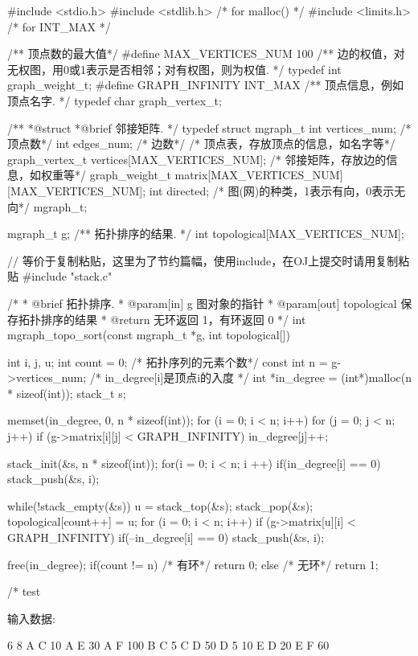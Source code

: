 \begin{Codex}[label=mgraph_topo_sort.c]
#include <stdio.h>
#include <stdlib.h>  /* for malloc() */
#include <limits.h>  /* for INT_MAX */

/** 顶点数的最大值*/
#define MAX_VERTICES_NUM 100
/** 边的权值，对无权图，用0或1表示是否相邻；对有权图，则为权值. */
typedef int graph_weight_t;
#define GRAPH_INFINITY INT_MAX
/** 顶点信息，例如顶点名字. */
typedef char graph_vertex_t;

/**
 *@struct
 *@brief 邻接矩阵.
 */
typedef struct mgraph_t {
    int vertices_num; /* 顶点数*/
    int edges_num; /* 边数*/
    /* 顶点表，存放顶点的信息，如名字等*/
    graph_vertex_t vertices[MAX_VERTICES_NUM];
    /* 邻接矩阵，存放边的信息，如权重等*/
    graph_weight_t matrix[MAX_VERTICES_NUM][MAX_VERTICES_NUM];
    int directed; /* 图(网)的种类，1表示有向，0表示无向*/
} mgraph_t;

mgraph_t g;
/** 拓扑排序的结果. */
int topological[MAX_VERTICES_NUM];

// 等价于复制粘贴，这里为了节约篇幅，使用include，在OJ上提交时请用复制粘贴
#include "stack.c"

/*
  * @brief 拓扑排序.
  * @param[in] g 图对象的指针
  * @param[out] topological 保存拓扑排序的结果
  * @return 无环返回 1，有环返回 0
  */
int mgraph_topo_sort(const mgraph_t *g, int topological[]) {
    int i, j, u;
    int count = 0; /* 拓扑序列的元素个数*/
    const int n = g->vertices_num;
    /* in_degree[i]是顶点i的入度 */
    int *in_degree = (int*)malloc(n * sizeof(int));
    stack_t s;

    memset(in_degree, 0, n * sizeof(int));
    for (i = 0; i < n; i++) {
        for (j = 0; j < n; j++) {
            if (g->matrix[i][j] < GRAPH_INFINITY)
                in_degree[j]++;
        }
    }

    stack_init(&s, n * sizeof(int));
    for(i = 0; i < n; i ++) {
        if(in_degree[i] == 0)
            stack_push(&s, i);
    }

    while(!stack_empty(&s)) {
        u = stack_top(&s); stack_pop(&s);
        topological[count++] = u;
        for (i = 0; i < n; i++) if (g->matrix[u][i] < GRAPH_INFINITY) {
            if(--in_degree[i] == 0) stack_push(&s, i);
        }
    }

    free(in_degree);
    if(count != n) { /* 有环*/
        return 0;
    } else { /* 无环*/
        return 1;
    }
}


/* test

输入数据:

6 8
A C 10
A E 30
A F 100
B C 5
C D 50
D 5 10
E D 20
E F 60


\end{Codex}
